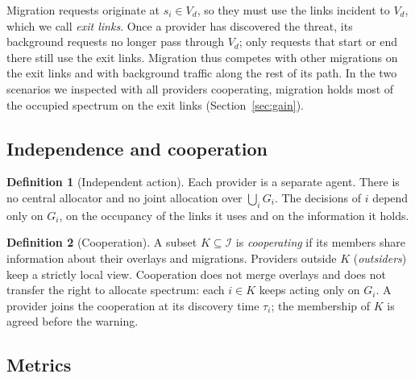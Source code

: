 \documentclass[11pt,a4paper]{article}
\theoremstyle{definition}
\newtheorem{definition}{Definition}
\begin{document}
Migration requests originate at $s_i\in V_d$, so they must use the links incident to $V_d$, which we call \emph{exit links}.
Once a provider has discovered the threat, its background requests no longer pass through $V_d$; only requests that start or end there still use the exit links.
Migration thus competes with other migrations on the exit links and with background traffic along the rest of its path. In the two scenarios we inspected with all providers cooperating, migration holds most of the occupied spectrum on the exit links (Section~\ref{sec:gain}).

\subsection{Independence and cooperation}

\begin{definition}[Independent action]
Each provider is a separate agent.
There is no central allocator and no joint allocation over $\bigcup_i G_i$.
The decisions of $i$ depend only on $G_i$, on the occupancy of the links it uses and on the information it holds.
\end{definition}

\begin{definition}[Cooperation]
A subset $K\subseteq\mathcal{I}$ is \emph{cooperating} if its members share information about their overlays and migrations.
Providers outside $K$ (\emph{outsiders}) keep a strictly local view.
Cooperation does not merge overlays and does not transfer the right to allocate spectrum: each $i\in K$ keeps acting only on $G_i$.
A provider joins the cooperation at its discovery time $\tau_i$; the membership of $K$ is agreed before the warning.
\end{definition}

\subsection{Metrics}
\end{document}
